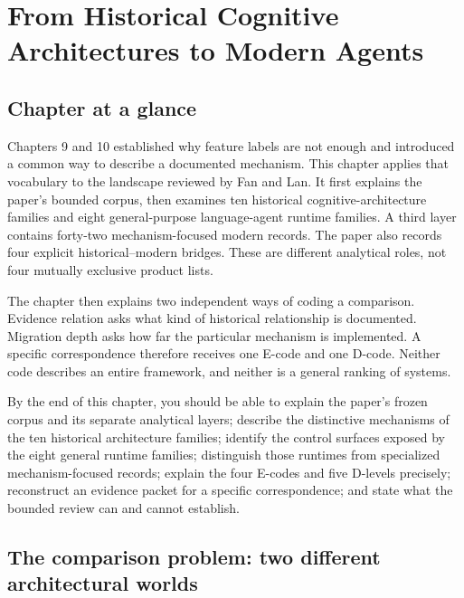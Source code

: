 \chapter{From Historical Cognitive Architectures to Modern Agents}
\label{ch:historical-to-modern-agents}

\section*{Chapter at a glance}
{}

Chapters 9 and 10 established why feature labels are not enough and introduced a common way to describe a documented mechanism. This chapter applies that vocabulary to the landscape reviewed by Fan and Lan. It first explains the paper's bounded corpus, then examines ten historical cognitive-architecture families and eight general-purpose language-agent runtime families. A third layer contains forty-two mechanism-focused modern records. The paper also records four explicit historical--modern bridges. These are different analytical roles, not four mutually exclusive product lists.

The chapter then explains two independent ways of coding a comparison. Evidence relation asks what kind of historical relationship is documented. Migration depth asks how far the particular mechanism is implemented. A specific correspondence therefore receives one E-code and one D-code. Neither code describes an entire framework, and neither is a general ranking of systems.

\begin{learningbox}
By the end of this chapter, you should be able to explain the paper's frozen corpus and its separate analytical layers; describe the distinctive mechanisms of the ten historical architecture families; identify the control surfaces exposed by the eight general runtime families; distinguish those runtimes from specialized mechanism-focused records; explain the four E-codes and five D-levels precisely; reconstruct an evidence packet for a specific correspondence; and state what the bounded review can and cannot establish.
\end{learningbox}

\section{The comparison problem: two different architectural worlds}
\label{sec:ch11-comparison-problem}

